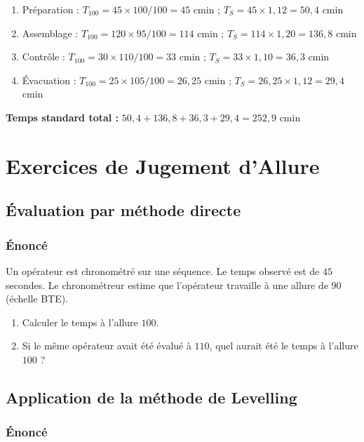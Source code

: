 \documentclass[a4paper,12pt]{article}
\begin{document}
\begin{enumerate}
    \item Préparation : $T_{100} = 45 \times 100/100 = 45$ cmin ; $T_S = 45 \times 1,12 = 50,4$ cmin
    \item Assemblage : $T_{100} = 120 \times 95/100 = 114$ cmin ; $T_S = 114 \times 1,20 = 136,8$ cmin
    \item Contrôle : $T_{100} = 30 \times 110/100 = 33$ cmin ; $T_S = 33 \times 1,10 = 36,3$ cmin
    \item Évacuation : $T_{100} = 25 \times 105/100 = 26,25$ cmin ; $T_S = 26,25 \times 1,12 = 29,4$ cmin
\end{enumerate}

\textbf{Temps standard total :} $50,4 + 136,8 + 36,3 + 29,4 = 252,9$ cmin

\section{Exercices de Jugement d'Allure}

\subsection{Évaluation par méthode directe}

\subsubsection*{Énoncé}

Un opérateur est chronométré sur une séquence. Le temps observé est de $45$ secondes. Le chronométreur estime que l'opérateur travaille à une allure de $90$ (échelle BTE).

\begin{enumerate}
    \item Calculer le temps à l'allure $100$.
    \item Si le même opérateur avait été évalué à $110$, quel aurait été le temps à l'allure $100$ ?
\end{enumerate}

\subsection{Application de la méthode de Levelling}

\subsubsection*{Énoncé}
\end{document}
